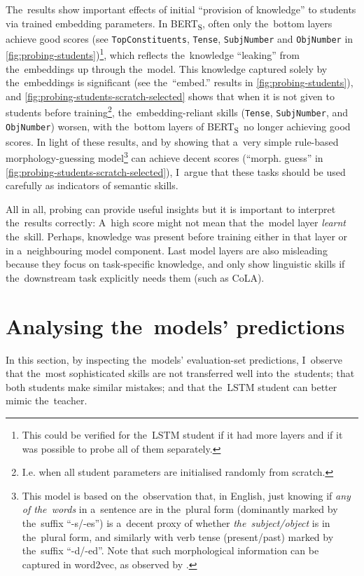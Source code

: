 \documentclass[bsc,frontabs,singlespacing,parskip,deptreport]{infthesis}
\def\BERTS{BERT\textsubscript{S}}
\begin{document}
{{    The~results show important effects of initial ``provision of knowledge'' to students via trained embedding parameters.
    In \BERTS, often only the~bottom layers achieve good scores (see \verb|TopConstituents|, \verb|Tense|, \verb|SubjNumber| and \verb|ObjNumber| in \autoref{fig:probing-students})\footnote{This could be verified for the~LSTM student if it had more layers and if it was possible to probe all of them separately.}, which reflects the~knowledge ``leaking'' from the~embeddings up through the~model.
    This knowledge captured solely by the~embeddings is significant (see the~``embed.'' results in \autoref{fig:probing-students}), and \autoref{fig:probing-students-scratch-selected} shows that when it is not given to students before training\footnote{I.e. when all student parameters are initialised randomly from scratch.}, the~embedding-reliant skills (\verb|Tense|, \verb|SubjNumber|, and \verb|ObjNumber|) worsen, with the~bottom layers of \BERTS~no longer achieving good scores.
    In light of these results, and by showing that a~very simple rule-based morphology-guessing model\footnote{This model is based on the~observation that, in English, just knowing if \textit{any of the~words} in a~sentence are in the~plural form (dominantly marked by the~suffix ``-s/-es'') is a~decent proxy of whether \textit{the~subject/object} is in the~plural form, and similarly with verb tense (present/past) marked by the~suffix ``-d/-ed''. Note that such morphological information can be captured in word2vec, as observed by \citet{Gieske_2017}.} can achieve decent scores (``morph. guess'' in \autoref{fig:probing-students-scratch-selected}), I~argue that these tasks should be used carefully as indicators of semantic skills.    

    All in all, probing can provide useful insights but it is important to interpret the~results correctly: A~high score might not mean that the~model layer \textit{learnt} the~skill. Perhaps, knowledge was present before training either in that layer or in a~neighbouring model component. Last model layers are also misleading because they focus on task-specific knowledge, and only show linguistic skills if the~downstream task explicitly needs them (such as CoLA).
  }

  \section{Analysing the~models' predictions}{
    In this section, by inspecting the~models' evaluation-set predictions, I~observe that the~most sophisticated skills are not transferred well into the~students; that both students make similar mistakes; and that the~LSTM student can better mimic the~teacher.

}}
\end{document}
